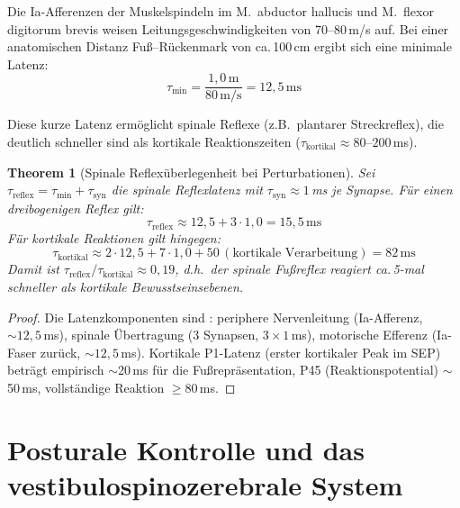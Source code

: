 ﻿\documentclass[12pt,a4paper]{report}
\theoremstyle{plain}
\newtheorem{theorem}{Theorem}[section]
\theoremstyle{definition}
\theoremstyle{remark}
\begin{document}
Die Ia-Afferenzen der Muskelspindeln im M.\ abductor hallucis und
M.\ flexor digitorum brevis weisen Leitungsgeschwindigkeiten von
70--80\,m/s auf. Bei einer anatomischen Distanz Fuß--Rückenmark von
ca.\,100\,cm ergibt sich eine minimale Latenz:
\[
  \tau_{\min} = \frac{1{,}0\,\text{m}}{80\,\text{m/s}} = 12{,}5\,\text{ms}
\]

Diese kurze Latenz ermöglicht spinale Reflexe (z.B.\ plantarer Streckreflex),
die deutlich schneller sind als kortikale Reaktionszeiten
($\tau_{\text{kortikal}} \approx 80$--$200$\,ms).

\begin{theorem}[Spinale Reflexüberlegenheit bei Perturbationen]
Sei $\tau_{\text{reflex}} = \tau_{\min} + \tau_{\text{syn}}$ die spinale Reflexlatenz
mit $\tau_{\text{syn}} \approx 1$\,ms je Synapse. Für einen dreibogenigen Reflex gilt:
\[
  \tau_{\text{reflex}} \approx 12{,}5 + 3 \cdot 1{,}0 = 15{,}5\,\text{ms}
\]
Für kortikale Reaktionen gilt hingegen:
\[
  \tau_{\text{kortikal}} \approx 2 \cdot 12{,}5 + 7 \cdot 1{,}0 + 50\,(\text{kortikale Verarbeitung})
  = 82\,\text{ms}
\]
Damit ist $\tau_{\text{reflex}} / \tau_{\text{kortikal}} \approx 0{,}19$, d.h.\ der spinale
Fußreflex reagiert ca.\,5-mal schneller als kortikale Bewusstseinsebenen.
\end{theorem}

\begin{proof}
Die Latenzkomponenten sind \cite{kandel2000}: periphere Nervenleitung
(Ia-Afferenz, $\sim 12{,}5$\,ms), spinale Übertragung (3 Synapsen,
$3 \times 1$\,ms), motorische Efferenz (Ia-Faser zurück, $\sim 12{,}5$\,ms).
Kortikale P1-Latenz (erster kortikaler Peak im SEP) beträgt empirisch
$\sim$20\,ms für die Fußrepräsentation, P45 (Reaktionspotential)
$\sim$50\,ms, vollständige Reaktion $\geq 80$\,ms.
\end{proof}

\chapter{Posturale Kontrolle und das vestibulospinozerebrale System}
\end{document}
